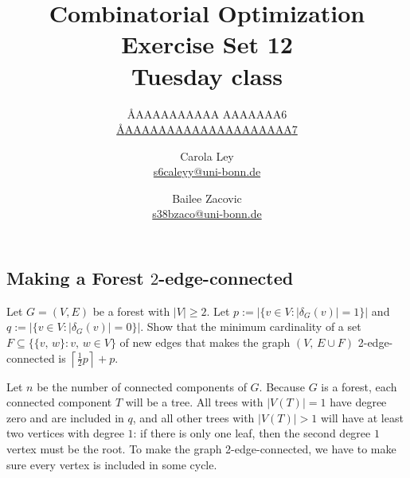 \documentclass{article}
\title{Combinatorial Optimization \\ Exercise Set 12 \\ Tuesday class}
\author{
  \AA{AAAAAAAAAA AAAAAAA}{6} \\
  \href{mailto:\AA{AAAAAAAAAAAAAAAAAAAA}{7}}{\AA{AAAAAAAAAAAAAAAAAAAA}{7}}
  \and
  Carola Ley \\
  \href{mailto:s6caleyy@uni-bonn.de}{s6caleyy@uni-bonn.de}
  \and
  Bailee Zacovic \\
  \href{mailto:s38bzaco@uni-bonn.de}{s38bzaco@uni-bonn.de}
}
\begin{document}
  \maketitle

  \setcounter{section}{12}
  \subsection{Making a Forest $2$-edge-connected}
  \begin{centerframebox}
    Let $G = (V, E)$ be a forest with $|V| \geq 2$.
    Let $p := |\{v \in V : |\delta_G(v)| = 1\}|$ and $q := |\{v \in V : |\delta_G(v)| = 0\}|$.
    Show that the minimum cardinality of a set $F \subseteq \{\{v,\, w\} : v,\, w \in V\}$
    of new edges that makes the graph $(V,\, E \cup F)$ 2-edge-connected is $\left\lceil\frac{1}{2} p\right\rceil + p$.
  \end{centerframebox}
  Let $n$ be the number of connected components of $G$.
  Because $G$ is a forest, each connected component $T$ will be a tree.
  All trees with $|V(T)| = 1$ have degree zero and are included in $q$,
  and all other trees with $|V(T)| > 1$ will have at least two vertices with degree $1$:
  if there is only one leaf, then the second degree $1$ vertex must be the root.
  To make the graph 2-edge-connected, we have to make sure every vertex is included in some cycle.
\end{document}
